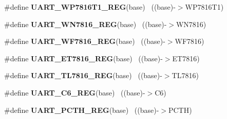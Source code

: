 \begin{DoxyCompactItemize}
\item 
\hypertarget{group___u_a_r_t___register___accessor___macros_gace5d9e6d68d47450211422bf36c9fe84}{}\#define {\bfseries U\+A\+R\+T\+\_\+\+W\+P7816\+T1\+\_\+\+R\+E\+G}(base)                                ~((base)-\/$>$W\+P7816\+T1)\label{group___u_a_r_t___register___accessor___macros_gace5d9e6d68d47450211422bf36c9fe84}

\item 
\hypertarget{group___u_a_r_t___register___accessor___macros_gaf7886bbd2d26e698f9c3e2037c2f9668}{}\#define {\bfseries U\+A\+R\+T\+\_\+\+W\+N7816\+\_\+\+R\+E\+G}(base)                                    ~((base)-\/$>$W\+N7816)\label{group___u_a_r_t___register___accessor___macros_gaf7886bbd2d26e698f9c3e2037c2f9668}

\item 
\hypertarget{group___u_a_r_t___register___accessor___macros_gaf1e0b56a76d8a2c4ca3779df8ffbf777}{}\#define {\bfseries U\+A\+R\+T\+\_\+\+W\+F7816\+\_\+\+R\+E\+G}(base)                                    ~((base)-\/$>$W\+F7816)\label{group___u_a_r_t___register___accessor___macros_gaf1e0b56a76d8a2c4ca3779df8ffbf777}

\item 
\hypertarget{group___u_a_r_t___register___accessor___macros_ga199178e229d7b224bf16cc80a56ed6e9}{}\#define {\bfseries U\+A\+R\+T\+\_\+\+E\+T7816\+\_\+\+R\+E\+G}(base)                                    ~((base)-\/$>$E\+T7816)\label{group___u_a_r_t___register___accessor___macros_ga199178e229d7b224bf16cc80a56ed6e9}

\item 
\hypertarget{group___u_a_r_t___register___accessor___macros_ga38ae78c4420364593b1df3ab6f788a02}{}\#define {\bfseries U\+A\+R\+T\+\_\+\+T\+L7816\+\_\+\+R\+E\+G}(base)                                    ~((base)-\/$>$T\+L7816)\label{group___u_a_r_t___register___accessor___macros_ga38ae78c4420364593b1df3ab6f788a02}

\item 
\hypertarget{group___u_a_r_t___register___accessor___macros_gaa2015d748f7505bb77b4de2abaeb825b}{}\#define {\bfseries U\+A\+R\+T\+\_\+\+C6\+\_\+\+R\+E\+G}(base)                                            ~((base)-\/$>$C6)\label{group___u_a_r_t___register___accessor___macros_gaa2015d748f7505bb77b4de2abaeb825b}

\item 
\hypertarget{group___u_a_r_t___register___accessor___macros_ga965053cc8a54bbedd8235ee6eb397ea5}{}\#define {\bfseries U\+A\+R\+T\+\_\+\+P\+C\+T\+H\+\_\+\+R\+E\+G}(base)                                        ~((base)-\/$>$P\+C\+T\+H)\label{group___u_a_r_t___register___accessor___macros_ga965053cc8a54bbedd8235ee6eb397ea5}


\end{DoxyCompactItemize}
